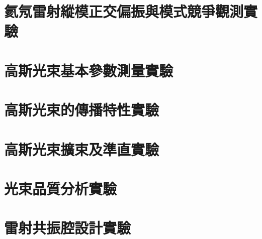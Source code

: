 \documentclass[10pt]{report}
\begin{document}
\chapter{氦氖雷射縱模正交偏振與模式競爭觀測實驗}

\chapter{高斯光束基本參數測量實驗}

\chapter{高斯光束的傳播特性實驗}

\chapter{高斯光束擴束及準直實驗}

\chapter{光束品質分析實驗}

\chapter{雷射共振腔設計實驗}

\end{document}
